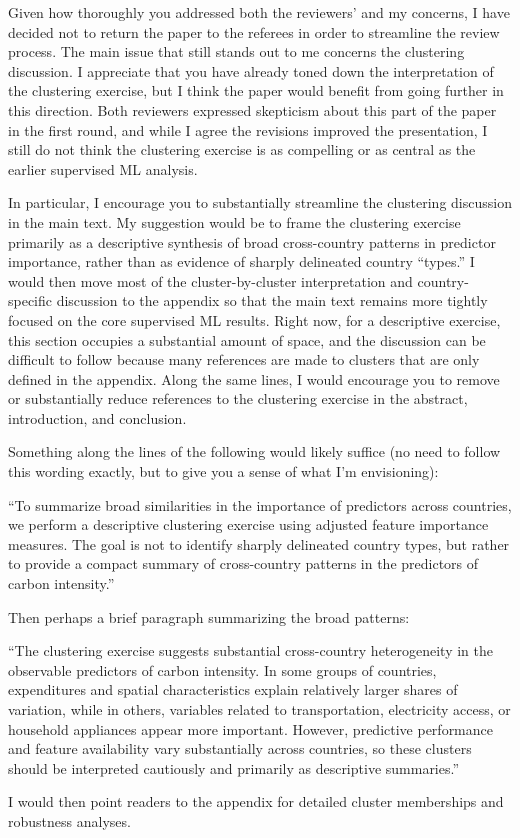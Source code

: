\documentclass[11pt]{article}
\begin{document}
\begin{commentbox}
    Given how thoroughly you addressed both the reviewers’ and my concerns, I have decided not to return the paper to the referees in order to streamline the review process. The main issue that still stands out to me concerns the clustering discussion. I appreciate that you have already toned down the interpretation of the clustering exercise, but I think the paper would benefit from going further in this direction. Both reviewers expressed skepticism about this part of the paper in the first round, and while I agree the revisions improved the presentation, I still do not think the clustering exercise is as compelling or as central as the earlier supervised ML analysis.

     In particular, I encourage you to substantially streamline the clustering discussion in the main text. My suggestion would be to frame the clustering exercise primarily as a descriptive synthesis of broad cross-country patterns in predictor importance, rather than as evidence of sharply delineated country “types.” I would then move most of the cluster-by-cluster interpretation and country-specific discussion to the appendix so that the main text remains more tightly focused on the core supervised ML results. Right now, for a descriptive exercise, this section occupies a substantial amount of space, and the discussion can be difficult to follow because many references are made to clusters that are only defined in the appendix. Along the same lines, I would encourage you to remove or substantially reduce references to the clustering exercise in the abstract, introduction, and conclusion.

     Something along the lines of the following would likely suffice (no need to follow this wording exactly, but to give you a sense of what I'm envisioning):

    “To summarize broad similarities in the importance of predictors across countries, we perform a descriptive clustering exercise using adjusted feature importance measures. The goal is not to identify sharply delineated country types, but rather to provide a compact summary of cross-country patterns in the predictors of carbon intensity.”
\end{commentbox}

\begin{commentbox}
   

    Then perhaps a brief paragraph summarizing the broad patterns:

    “The clustering exercise suggests substantial cross-country heterogeneity in the observable predictors of carbon intensity. In some groups of countries, expenditures and spatial characteristics explain relatively larger shares of variation, while in others, variables related to transportation, electricity access, or household appliances appear more important. However, predictive performance and feature availability vary substantially across countries, so these clusters should be interpreted cautiously and primarily as descriptive summaries.”

    I would then point readers to the appendix for detailed cluster memberships and robustness analyses.   
\end{commentbox}
\end{document}
